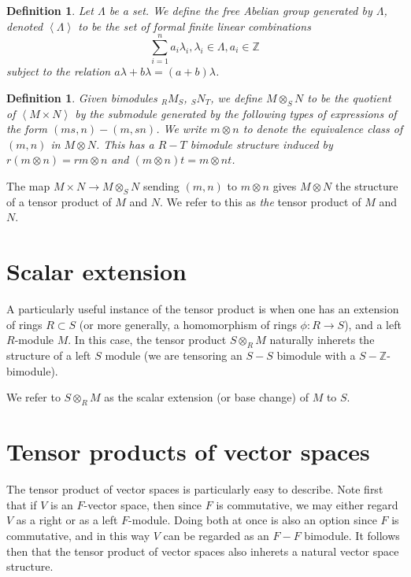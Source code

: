 \documentclass[12pt]{report}
\theoremstyle{plain}
\newtheorem{defn}[thm]{Definition}
\newcommand{\ZZ}{\mathbb{Z}}
\begin{document}
\begin{defn}
Let $\Lambda$ be a set. We define the free Abelian group
generated by $\Lambda$, denoted $\left<\Lambda\right>$ to be the set
of formal finite linear combinations
\[\sum_{i = 1}^n a_i \lambda_i , \lambda_i \in
\Lambda, a_i \in \ZZ \]
subject to the relation $a \lambda + b \lambda = (a + b) \lambda$.
\end{defn}

\begin{defn}
Given bimodules $_R M _S$, $_S N _T$, we define $M \otimes_S N$ to be the
quotient of $\left< M \times N \right>$ by the submodule generated by
the following types of expressions of the form $(ms, n) - (m, sn)$.
We write $m \otimes n$ to denote the equivalence class of $(m,
n)$ in $M \otimes N$. This has a $R-T$ bimodule structure induced by $r(m
\otimes n) = rm \otimes n$ and $(m \otimes n) t = m \otimes nt$.
\end{defn}

The map $M \times N \to M \otimes_S N$ sending $(m, n)$ to $m \otimes n$
gives $M \otimes N$ the structure of a tensor product of $M$ and $N$. We
refer to this as \textit{the} tensor product of $M$ and $N$.

\section{Scalar extension}

A particularly useful instance of the tensor product is when one has an
extension of rings $R \subset S$ (or more generally, a homomorphism of
rings $\phi : R \to S$), and a left $R$-module $M$. In this case, the
tensor product $S \otimes_R M$ naturally inherets the structure of a left
$S$ module (we are tensoring an $S-S$ bimodule with a $S-\ZZ$-bimodule).

We refer to $S \otimes_R M$ as the scalar extension (or base change) of $M$
to $S$.

\section{Tensor products of vector spaces}

The tensor product of vector spaces is particularly easy to describe. Note
first that if $V$ is an $F$-vector space, then since $F$ is commutative, we
may either regard $V$ as a right or as a left $F$-module. Doing both at
once is also an option since $F$ is commutative, and in this way $V$ can be
regarded as an $F-F$ bimodule. It follows then that the tensor product of
vector spaces also inherets a natural vector space structure.
\end{document}
